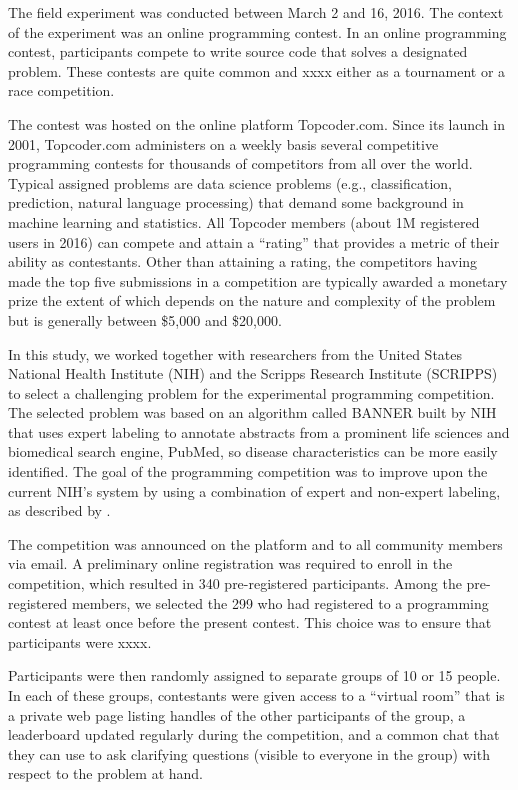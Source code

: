 \documentclass[12pt,]{article}
\theoremstyle{plain} %
\begin{document}
The field experiment was conducted between March 2 and 16, 2016. The
context of the experiment was an online programming contest. In an
online programming contest, participants compete to write source code
that solves a designated problem. These contests are quite common and
xxxx either as a tournament or a race competition.

The contest was hosted on the online platform Topcoder.com. Since its
launch in 2001, Topcoder.com administers on a weekly basis several
competitive programming contests for thousands of competitors from all
over the world. Typical assigned problems are data science problems
(e.g., classification, prediction, natural language processing) that
demand some background in machine learning and statistics. All Topcoder
members (about 1M registered users in 2016) can compete and attain a
``rating'' that provides a metric of their ability as contestants. Other
than attaining a rating, the competitors having made the top five
submissions in a competition are typically awarded a monetary prize the
extent of which depends on the nature and complexity of the problem but
is generally between \$5,000 and \$20,000.

In this study, we worked together with researchers from the United
States National Health Institute (NIH) and the Scripps Research
Institute (SCRIPPS) to select a challenging problem for the experimental
programming competition. The selected problem was based on an algorithm
called BANNER built by NIH \citep{leaman2008banner} that uses expert
labeling to annotate abstracts from a prominent life sciences and
biomedical search engine, PubMed, so disease characteristics can be more
easily identified. The goal of the programming competition was to
improve upon the current NIH's system by using a combination of expert
and non-expert labeling, as described by \citet{good2014microtask}.

The competition was announced on the platform and to all community
members via email. A preliminary online registration was required to
enroll in the competition, which resulted in 340 pre-registered
participants. Among the pre-registered members, we selected the 299 who
had registered to a programming contest at least once before the present
contest. This choice was to ensure that participants were xxxx.

Participants were then randomly assigned to separate groups of 10 or 15
people. In each of these groups, contestants were given access to a
``virtual room'' that is a private web page listing handles of the other
participants of the group, a leaderboard updated regularly during the
competition, and a common chat that they can use to ask clarifying
questions (visible to everyone in the group) with respect to the problem
at hand.
\end{document}
